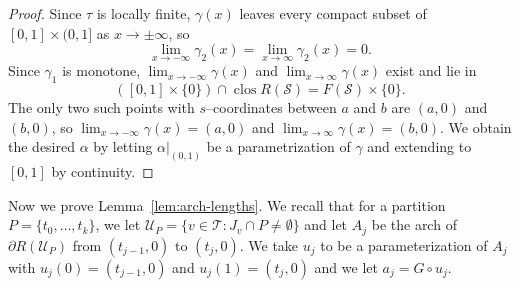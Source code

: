 \documentclass[12pt,reqno]{amsart}
\newcommand{\cS}{\mathcal{S}}
\newcommand{\cT}{\mathcal{T}}
\newcommand{\cU}{\mathcal{U}}
\theoremstyle{remark}
\newcommand{\0}{\mathbf{0}}
\renewcommand{\1}{\mathbf 1}
\DeclareMathOperator{\closure}{clos}
\begin{document}
\begin{proof}
  Since $\tau$ is locally finite, $\gamma(x)$ leaves every compact subset of $[0,1]\times (0,1]$ as $x\to \pm \infty$, so
  $$\lim_{x\to -\infty} \gamma_2(x)=\lim_{x\to \infty} \gamma_2(x)=0.$$
  Since $\gamma_1$ is monotone, $\lim_{x\to -\infty} \gamma(x)$ and $\lim_{x\to \infty} \gamma(x)$ exist and lie in
  $$([0,1]\times \{0\}) \cap \closure R(\cS) = F(\cS)\times \{0\}.$$
  The only two such points with $s$--coordinates between $a$ and $b$ are $(a,0)$ and $(b,0)$, so $\lim_{x\to -\infty} \gamma(x) = (a,0)$ and $\lim_{x\to \infty} \gamma(x) = (b,0)$. We obtain the desired $\alpha$ by letting $\alpha|_{(0,1)}$ be a parametrization of $\gamma$ and extending to $[0,1]$ by continuity.
\end{proof} 

Now we prove Lemma~\ref{lem:arch-lengths}. We recall that for a partition $P=\{t_0,\dots,t_k\}$, we let $\cU_P = \{v\in \cT : J_{v}\cap P\ne \emptyset\}$ and let $A_j$ be the arch of $\partial R(\cU_P)$ from $(t_{j-1},0)$ to $(t_j,0)$. We take $u_j$ to be a parameterization of $A_j$ with $u_j(0) = (t_{j-1},0)$ and $u_j(1) = (t_{j},0)$ and we let $a_j = G\circ u_j$.
\end{document}
